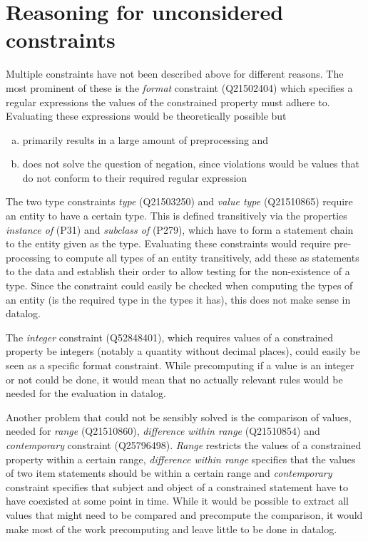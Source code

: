 \documentclass[hyperref,bachelorofscience,fleqn]{cgvpub}
\begin{document}
\section{Reasoning for unconsidered constraints}
Multiple constraints have not been described above for different reasons. The most prominent of these is the \emph{format} constraint (Q21502404) which specifies a regular expressions the values of the constrained property must adhere to. Evaluating these expressions would be theoretically possible but \\
\begin{enumerate}[a)]
\item primarily results in a large amount of preprocessing and
\item does not solve the question of negation, since violations would be values that do not conform to their required regular expression
\end{enumerate}

The two type constraints \emph{type} (Q21503250) and \emph{value type} (Q21510865) require an entity to have a certain type. This is defined transitively via the properties \emph{instance of} (P31) and \emph{subclass of} (P279), which have to form a statement chain to the entity given as the type. Evaluating these constraints would require pre-processing to compute all types of an entity transitively, add these as statements to the data and establish their order to allow testing for the non-existence of a type. Since the constraint could easily be checked when computing the types of an entity (is the required type in the types it has), this does not make sense in datalog.

The \emph{integer} constraint (Q52848401), which requires values of a constrained property be integers (notably a quantity without decimal places), could easily be seen as a specific format constraint. While precomputing if a value is an integer or not could be done, it would mean that no actually relevant rules would be needed for the evaluation in datalog.

Another problem that could not be sensibly solved is the comparison of values, needed for \emph{range} (Q21510860), \emph{difference within range} (Q21510854) and \emph{contemporary} constraint (Q25796498). \emph{Range} restricts the values of a constrained property within a certain range, \emph{difference within range} specifies that the values of two item statements should be within a certain range and \emph{contemporary} constraint specifies that subject and object of a constrained statement have to have coexisted at some point in time. While it would be possible to extract all values that might need to be compared and precompute the comparison, it would make most of the work precomputing and leave little to be done in datalog.
\end{document}
